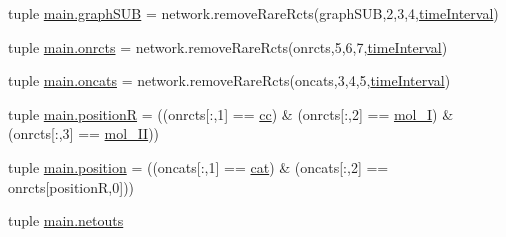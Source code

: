 \begin{DoxyCompactItemize}
\item 
tuple \hyperlink{a00122_ab96de87bc8cbe59221256af996bdc43e}{main.\-graph\-S\-U\-B} = network.\-remove\-Rare\-Rcts(graph\-S\-U\-B,2,3,4,\hyperlink{a00021_a430673c9821c17e4bf93cd42f59e00bb}{time\-Interval})
\item 
tuple \hyperlink{a00122_ab26ffc3eda5d201a779d705813b06348}{main.\-onrcts} = network.\-remove\-Rare\-Rcts(onrcts,5,6,7,\hyperlink{a00021_a430673c9821c17e4bf93cd42f59e00bb}{time\-Interval})
\item 
tuple \hyperlink{a00122_ab4d380bc4bfcb970acc39ddf18a73972}{main.\-oncats} = network.\-remove\-Rare\-Rcts(oncats,3,4,5,\hyperlink{a00021_a430673c9821c17e4bf93cd42f59e00bb}{time\-Interval})
\item 
tuple \hyperlink{a00122_adbbdc0f6ad0f08400b3e492f7a807a6b}{main.\-position\-R} = ((onrcts\mbox{[}\-:,1\mbox{]} == \hyperlink{a00021_afb5980388a6e55ca55437b53cdaf528a}{cc}) \& (onrcts\mbox{[}\-:,2\mbox{]} == \hyperlink{a00021_ab346189eef5359a07ba32144ddcd4465}{mol\-\_\-\-I}) \& (onrcts\mbox{[}\-:,3\mbox{]} == \hyperlink{a00021_a4d2c086887289f8900b38ffa56854da3}{mol\-\_\-\-I\-I}))
\item 
tuple \hyperlink{a00122_ac67c60df3cc9afae7e4888d2b48b846d}{main.\-position} = ((oncats\mbox{[}\-:,1\mbox{]} == \hyperlink{a00021_a7073f71a43389f3032e69b1fffc2551a}{cat}) \& (oncats\mbox{[}\-:,2\mbox{]} == onrcts\mbox{[}position\-R,0\mbox{]}))
\item 
tuple \hyperlink{a00122_a02c2194d4e56d3d8c6d2c204a8017e3a}{main.\-netouts}
\end{DoxyCompactItemize}
